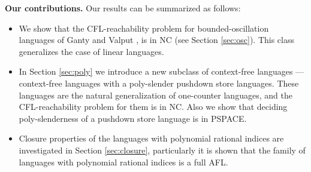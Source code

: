 \documentclass[smallextended]{svjour3}       %
\begin{document}
\textbf{Our contributions.} Our results can be summarized as follows:
\begin{itemize}
\item We show that the CFL-reachability problem for bounded-oscillation languages of Ganty and Valput \cite{BoundOsc}, is in NC (see Section \ref{sec:osc}). This class generalizes the case of linear languages. 
\item In Section \ref{sec:poly} we introduce a new subclass of context-free languages --- context-free languages with a poly-slender pushdown store languages. These languages are the natural generalization of one-counter languages, and the CFL-reachability problem for them is in NC. Also we show that deciding poly-slenderness of a pushdown store language is in PSPACE.  
\item Closure properties of the languages with polynomial rational indices are investigated in Section \ref{sec:closure}, particularly it is shown that the family of languages with polynomial rational indices is a full AFL.
\end{itemize}




\end{document}
